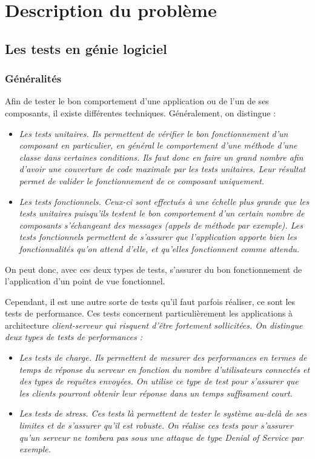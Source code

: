 \chapter{Description du problème}

\section{Les tests en génie logiciel}
\subsection{Généralités}
Afin de tester le bon comportement d'une application ou de l'un de ses composants, il existe différentes techniques. Généralement, on distingue :
\begin{itemize}
  \item \em{Les tests unitaires}. Ils permettent de vérifier le bon fonctionnement d'un composant en particulier, en général le comportement d'une méthode d'une classe dans certaines conditions. Ils faut donc en faire un grand nombre afin d'avoir une couverture de code maximale par les tests unitaires. Leur résultat permet de valider le fonctionnement de ce composant uniquement.
  \item \em{Les tests fonctionnels}. Ceux-ci sont effectués à une échelle plus grande que les tests unitaires puisqu'ils testent le bon comportement d'un certain nombre de composants s'échangeant des messages (appels de méthode par exemple). Les tests fonctionnels permettent de s'assurer que l'application apporte bien les fonctionnalités qu'on attend d'elle, et qu'elles fonctionnent comme attendu.
\end{itemize}
On peut donc, avec ces deux types de tests, s'assurer du bon fonctionnement de l'application d'un point de vue fonctionnel.

Cependant, il est une autre sorte de tests qu'il faut parfois réaliser, ce sont les tests de performance. Ces tests concernent particulièrement les applications à architecture \em{client-serveur} qui risquent d'être fortement sollicitées. On distingue deux types de tests de performances : 
\begin{itemize}
  \item \em{Les tests de charge}. Ils permettent de mesurer des performances en termes de temps de réponse du serveur en fonction du nombre d'utilisateurs connectés et des types de requêtes envoyées. On utilise ce type de test pour s'assurer que les clients pourront obtenir leur réponse dans un temps suffisament court.
  \item \em{Les tests de stress}. Ces tests là permettent de tester le système au-delà de ses limites et de s'assurer qu'il est robuste. On réalise ces tests pour s'assurer qu'un serveur ne tombera pas sous une attaque de type \em{Denial of Service} par exemple.
\end{itemize}

